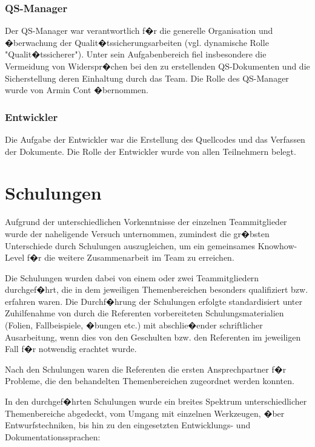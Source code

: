 \documentclass[a4paper,titlepage,12pt,ngerman]{scrbook}
\begin{document}
\subsubsection{QS-Manager}

Der QS-Manager war verantwortlich f�r die
generelle Organisation und �berwachung der
Qualit�tssicherungsarbeiten (vgl. dynamische
Rolle "Qualit�tssicherer"). Unter sein Aufgabenbereich fiel
insbesondere die Vermeidung von Widerspr�chen bei den zu
erstellenden QS-Dokumenten und die Sicherstellung deren Einhaltung
durch das Team. Die Rolle des QS-Manager wurde von Armin Cont �bernommen.

\subsubsection{Entwickler}

Die Aufgabe der Entwickler war die Erstellung des Quellcodes und das
Verfassen der Dokumente. Die Rolle der Entwickler wurde von allen
Teilnehmern belegt.

\section{Schulungen}

Aufgrund der unterschiedlichen Vorkenntnisse der einzelnen Teammitglieder
wurde der naheligende Versuch unternommen, zumindest die gr�bsten Unterschiede
durch Schulungen auszugleichen, um ein gemeinsames Knowhow-Level f�r die weitere
Zusammenarbeit im Team zu erreichen.\par

Die Schulungen wurden dabei von einem oder zwei Teammitgliedern durchgef�hrt, die
in dem jeweiligen Themenbereichen besonders qualifiziert bzw. erfahren waren. Die
Durchf�hrung der Schulungen erfolgte standardisiert unter Zuhilfenahme von durch
die Referenten vorbereiteten Schulungsmaterialien (Folien, Fallbeispiele, �bungen etc.) 
mit abschlie�ender schriftlicher Ausarbeitung, wenn dies von den Geschulten bzw. den
Referenten im jeweiligen Fall f�r notwendig erachtet wurde.\par

Nach den Schulungen waren die Referenten die ersten Ansprechpartner f�r Probleme, die
den behandelten Themenbereichen zugeordnet werden konnten.\par

In den durchgef�hrten Schulungen wurde ein breites Spektrum unterschiedlicher Themenbereiche
abgedeckt, vom Umgang mit einzelnen Werkzeugen, �ber Entwurfstechniken, bis hin zu den
eingesetzten Entwicklungs- und Dokumentationssprachen:
\end{document}
